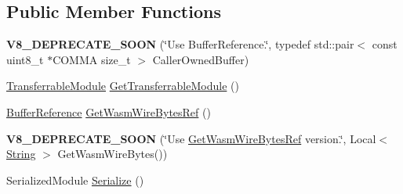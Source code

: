 \subsection*{Public Member Functions}
\begin{DoxyCompactItemize}
\item 
\mbox{\label{classv8_1_1WasmCompiledModule_a982ad3bddae17c42b2f61b3231511915}} 
{\bfseries V8\+\_\+\+D\+E\+P\+R\+E\+C\+A\+T\+E\+\_\+\+S\+O\+ON} (\char`\"{}Use Buffer\+Reference.\char`\"{}, typedef std\+::pair$<$ const uint8\+\_\+t $\ast$C\+O\+M\+MA size\+\_\+t $>$ Caller\+Owned\+Buffer)
\item 
\mbox{\hyperlink{classv8_1_1WasmCompiledModule_1_1TransferrableModule}{Transferrable\+Module}} \mbox{\hyperlink{classv8_1_1WasmCompiledModule_a5872dd7762bf1c1ebcef833d8356f6ad}{Get\+Transferrable\+Module}} ()
\item 
\mbox{\hyperlink{structv8_1_1WasmCompiledModule_1_1BufferReference}{Buffer\+Reference}} \mbox{\hyperlink{classv8_1_1WasmCompiledModule_ad889c2d766016ebf74b7093e8b210aa2}{Get\+Wasm\+Wire\+Bytes\+Ref}} ()
\item 
\mbox{\label{classv8_1_1WasmCompiledModule_a92a8acb39305ce3bfa4c9029b91c2136}} 
{\bfseries V8\+\_\+\+D\+E\+P\+R\+E\+C\+A\+T\+E\+\_\+\+S\+O\+ON} (\char`\"{}Use \mbox{\hyperlink{classv8_1_1WasmCompiledModule_ad889c2d766016ebf74b7093e8b210aa2}{Get\+Wasm\+Wire\+Bytes\+Ref}} version.\char`\"{}, Local$<$ \mbox{\hyperlink{classv8_1_1String}{String}} $>$ Get\+Wasm\+Wire\+Bytes())
\item 
Serialized\+Module \mbox{\hyperlink{classv8_1_1WasmCompiledModule_a56ba174cfc319056ecdfc870e6c9d832}{Serialize}} ()
\end{DoxyCompactItemize}
